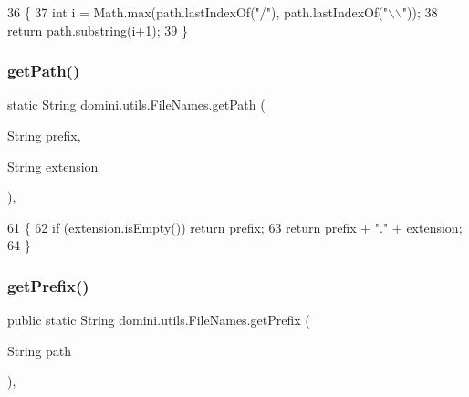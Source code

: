 \begin{DoxyCode}
36                                               \{
37         \textcolor{keywordtype}{int} i = Math.max(path.lastIndexOf(\textcolor{stringliteral}{"/"}), path.lastIndexOf(\textcolor{stringliteral}{"\(\backslash\)\(\backslash\)"}));
38         \textcolor{keywordflow}{return} path.substring(i+1);
39     \}
\end{DoxyCode}
\mbox{\label{classdomini_1_1utils_1_1FileNames_a12c91817013f1485a2318621f3fc1312}} 
\subsubsection{\texorpdfstring{get\+Path()}{getPath()}}
{\footnotesize\ttfamily static String domini.\+utils.\+File\+Names.\+get\+Path (\begin{DoxyParamCaption}\item[{String}]{prefix,  }\item[{String}]{extension }\end{DoxyParamCaption})\hspace{0.3cm}{\ttfamily [inline]}, {\ttfamily [static]}}


\begin{DoxyCode}
61                                                                   \{
62         \textcolor{keywordflow}{if} (extension.isEmpty()) \textcolor{keywordflow}{return} prefix;
63         \textcolor{keywordflow}{return} prefix + \textcolor{stringliteral}{"."} + extension;
64     \}
\end{DoxyCode}
\mbox{\label{classdomini_1_1utils_1_1FileNames_a217ed1d50727e5109fdbd626a3b5bf07}} 
\subsubsection{\texorpdfstring{get\+Prefix()}{getPrefix()}}
{\footnotesize\ttfamily public static String domini.\+utils.\+File\+Names.\+get\+Prefix (\begin{DoxyParamCaption}\item[{String}]{path }\end{DoxyParamCaption})\hspace{0.3cm}{\ttfamily [inline]}, {\ttfamily [static]}}


